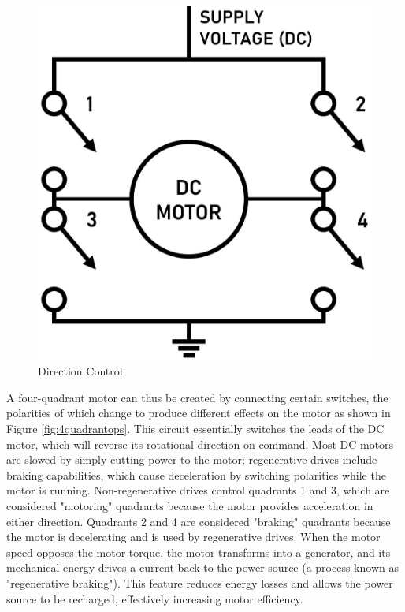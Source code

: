 \begin{figure}[H]
    \centering
    \includegraphics[scale=0.2]{Figures/DirectionControl.jpg}
    \caption[Direction Control]{Direction Control \cite{noauthor_all_nodate}}
    \label{fig:directionControl}
\end{figure}

A four-quadrant motor can thus be created by connecting certain switches, the polarities of which change to produce different effects on the motor as shown in Figure \ref{fig:4quadrantops}. This circuit essentially switches the leads of the DC motor, which will reverse its rotational direction on command. Most DC motors are slowed by simply cutting power to the motor; regenerative drives include braking capabilities, which cause deceleration by switching polarities while the motor is running. Non-regenerative drives control quadrants 1 and 3, which are considered "motoring" quadrants because the motor provides acceleration in either direction. Quadrants 2 and 4 are considered "braking" quadrants because the motor is decelerating and is used by regenerative drives. When the motor speed opposes the motor torque, the motor transforms into a generator, and its mechanical energy drives a current back to the power source (a process known as "regenerative braking"). This feature reduces energy losses and allows the power source to be recharged, effectively increasing motor efficiency.

